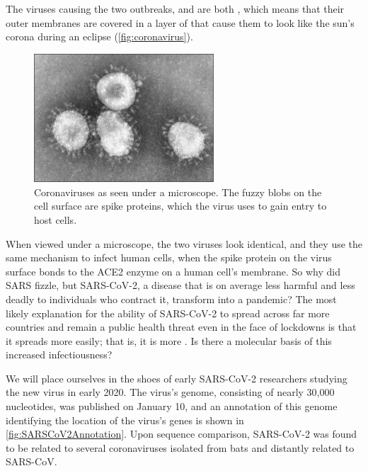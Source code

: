 The viruses causing the two outbreaks,  and  are both , which means that their outer membranes are covered in a layer of  that cause them to look like the sun's corona during an eclipse (\autoref{fig:coronavirus}).

\begin{figure}[h]
	\centering
	\mySfFamily
	\includegraphics[width = 0.6\textwidth]{../images/coronavirus.png}
	\caption{Coronaviruses as seen under a microscope. The fuzzy blobs on the cell surface are spike proteins, which the virus uses to gain entry to host cells.}
	\label{fig:coronavirus}
\end{figure}

When viewed under a microscope, the two viruses look identical, and they use the same mechanism to infect human cells, when the spike protein on the virus surface bonds to the ACE2 enzyme on a human cell's membrane. So why did SARS fizzle, but SARS-CoV-2, a disease that is on average less harmful and less deadly to individuals who contract it, transform into a pandemic? The most likely explanation for the ability of SARS-CoV-2 to spread across far more countries and remain a public health threat even in the face of lockdowns is that it spreads more easily; that is, it is more . Is there a molecular basis of this increased infectiousness?

We will place ourselves in the shoes of early SARS-CoV-2 researchers studying the new virus in early 2020. The virus's genome, consisting of nearly 30,000 nucleotides, was published on January 10, and an annotation of this genome identifying the location of the virus's genes is shown in \autoref{fig:SARSCoV2Annotation}. Upon sequence comparison, SARS-CoV-2 was found to be related to several coronaviruses isolated from bats and distantly related to SARS-CoV.


